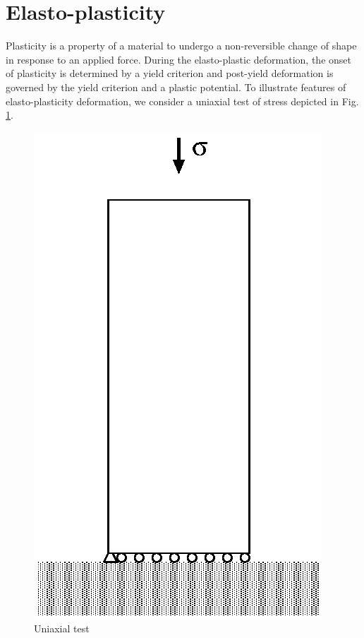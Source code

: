 \section{Elasto-plasticity}

Plasticity is a property of a material to undergo a non-reversible change of shape in response to an applied force. During the elasto-plastic deformation, the onset of plasticity is determined by a yield criterion and post-yield deformation is governed by the yield criterion and a plastic potential. To illustrate features of elasto-plasticity deformation, we consider a uniaxial test of stress depicted in Fig. \ref{fig:uniax_test}.

\begin{figure}[!htb]
  \centering
  \includegraphics[scale=0.6]{M/figure/uniaxial.eps}
  \caption{Uniaxial test }
  \label{fig:uniax_test}
\end{figure}

